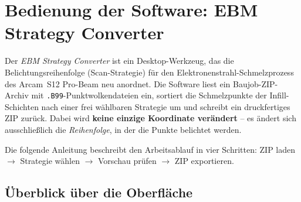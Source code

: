 %
%
%

\providecommand{\blacktriangleright}{\ensuremath{\triangleright}}
\providecommand{\blacksquare}{\ensuremath{\bullet}}

\section{Bedienung der Software: EBM Strategy Converter}
\label{sec:ebm-anleitung}

Der \emph{EBM Strategy Converter} ist ein Desktop-Werkzeug, das die
Belichtungsreihenfolge (Scan-Strategie) für den Elektronenstrahl-Schmelzprozess
des Arcam~S12 Pro-Beam neu anordnet. Die Software liest ein Baujob-ZIP-Archiv
mit \texttt{.B99}-Punktwolkendateien ein, sortiert die Schmelzpunkte der
Infill-Schichten nach einer frei wählbaren Strategie um und schreibt ein
druckfertiges ZIP zurück. Dabei wird \textbf{keine einzige Koordinate
verändert} -- es ändert sich ausschließlich die \emph{Reihenfolge}, in der die
Punkte belichtet werden.

Die folgende Anleitung beschreibt den Arbeitsablauf in vier Schritten:
ZIP laden $\rightarrow$ Strategie wählen $\rightarrow$ Vorschau prüfen
$\rightarrow$ ZIP exportieren.

\subsection{Überblick über die Oberfläche}
\label{subsec:ebm-overview}

